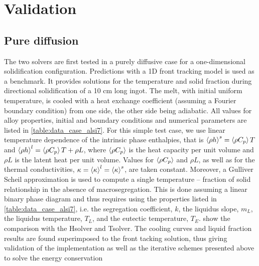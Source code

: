 \section{Validation}
%
\subsection{Pure diffusion}
The two solvers are first tested in a purely diffusive case for a one-dimensional solidification configuration. 
Predictions with a 1D front tracking model \citep{gandin_constrained_2000} is used as a benchmark. It provides 
solutions for the temperature and solid fraction during directional solidification of a 10 cm long 
ingot. The melt, with initial uniform temperature, is cooled with a heat exchange coefficient (assuming a Fourier 
boundary condition) from one side, the other side being adiabatic. All values for alloy properties, initial and 
boundary conditions and numerical parameters are listed in \cref{table:data_case_alsi7}. For this simple test case, 
we use linear temperature dependence of the intrinsic phase enthalpies, that is $\left \langle  \rho h  \right \rangle^s= \left \langle  \rho C_p  \right \rangle T$ and $\left \langle  \rho h  \right \rangle^l= \left \langle  \rho C_p  \right \rangle T + \rho L$, 
where $\left \langle  \rho C_p  \right \rangle$ is the heat capacity per unit volume and $\rho L$ is the latent heat per unit volume. Values for $\left \langle  \rho C_p  \right \rangle$ 
and $\rho L$, as well as for the thermal conductivities, $\kappa = \left \langle \kappa \right \rangle^l = \left \langle \kappa \right \rangle^s$, are taken constant. Moreover, a 
Gulliver Scheil approximation is used to compute a single temperature – fraction of solid relationship in the 
absence of macrosegregation. This is done assuming a linear binary phase diagram and thus requires using the 
properties listed in \cref{table:data_case_alsi7}, i.e. the segregation coefficient, $k$, the liquidus slope, $m_L$, the 
liquidus temperature, $T_L$, and the eutectic temperature, $T_E$.  show the comparison with 
the Hsolver and Tsolver. The cooling curves and liquid fraction results are found superimposed to the front tacking solution, 
thus giving validation of the implementation as well as the iterative schemes presented above to solve the energy conservation 
